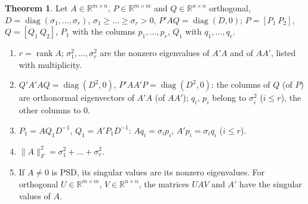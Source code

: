 \documentclass[12pt]{article}
\newcommand{\R}{\mathbb R}
\DeclareMathOperator{\diag}{diag}
\DeclareMathOperator{\rank}{rank}
\theoremstyle{definition}
\newtheorem{theorem}{Theorem}
\begin{document}
\begin{theorem}\label{b15.10}
Let \(A\in\R^{m\times n}\), \(P\in\R^{m\times m}\) and \(Q\in\R^{n\times n}\) orthogonal,
\(D=\diag(\sigma_1,\dots,\sigma_r)\), \(\sigma_1\geqslant\dots\geqslant\sigma_r>0\), \(P'AQ=\diag(D,0)\);
\(P=[P_1\ P_2]\), \(Q=[Q_1\ Q_2]\), \(P_1\) with the columns \(p_1,\dots,p_r\), \(Q_1\) with \(q_1,\dots,q_r\).
\begin{enumerate}
\item \(r=\rank A\); \(\sigma_1^2,\dots,\sigma_r^2\) are the nonzero eigenvalues of \(A'A\) and of \(AA'\), listed with
multiplicity.
\item \(Q'A'AQ=\diag(D^2,0)\), \(P'AA'P=\diag(D^2,0)\): the columns of \(Q\) (of \(P\)) are orthonormal eigenvectors of
\(A'A\) (of \(AA'\)); \(q_i\), \(p_i\) belong to \(\sigma_i^2\) (\(i\leqslant r\)), the other columns to \(0\).
\item \(P_1=AQ_1D^{-1}\), \(Q_1=A'P_1D^{-1}\): \(Aq_i=\sigma_ip_i\), \(A'p_i=\sigma_iq_i\) (\(i\leqslant r\)).
\item \(\lVert A\rVert_F^2=\sigma_1^2+\dots+\sigma_r^2\).
\item If \(A\ne0\) is PSD, its singular values are its nonzero eigenvalues. For orthogonal \(U\in\R^{m\times m}\),
\(V\in\R^{n\times n}\), the matrices \(UAV\) and \(A'\) have the singular values of \(A\).
\end{enumerate}
\end{theorem}
\end{document}
